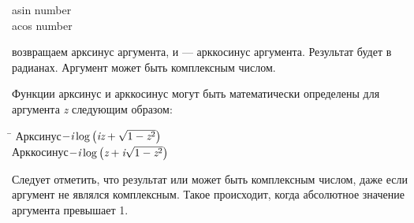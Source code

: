 \begin{defun}[Функция]
asin number \\
acos number

 возвращаем арксинус аргумента, и  --- арккосинус аргумента.
Результат будет в радианах. Аргумент может быть комплексным числом.

Функции арксинус и арккосинус могут быть математически определены для аргумента
\emph{z} следующим образом:
\begin{tabbing}
\hskip 10pc\=\kill
Арксинус\>$ -\emph{i} \log \left(\emph{i}\emph{z} + \sqrt{1-\emph{z}^2}\right) $ \\[2pt]
Арккосинус\>$ -\emph{i} \log \left(\emph{z} + \emph{i}\sqrt{1-\emph{z}^2}\right) $
\end{tabbing}
Следует отметить, что результат  или  может быть комплексным
числом, даже если аргумент не являлся комплексным. Такое происходит, когда
абсолютное значение аргумента превышает 1.
\end{defun}

